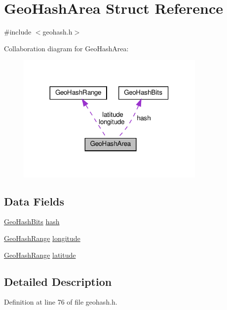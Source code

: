 \hypertarget{struct_geo_hash_area}{}\section{Geo\+Hash\+Area Struct Reference}
\label{struct_geo_hash_area}


{\ttfamily \#include $<$geohash.\+h$>$}



Collaboration diagram for Geo\+Hash\+Area\+:
\nopagebreak
\begin{figure}[H]
\begin{center}
\leavevmode
\includegraphics[width=260pt]{struct_geo_hash_area__coll__graph}
\end{center}
\end{figure}
\subsection*{Data Fields}
\begin{DoxyCompactItemize}
\item 
\hyperlink{struct_geo_hash_bits}{Geo\+Hash\+Bits} \hyperlink{struct_geo_hash_area_aaa5dc202256f654179069f62d2d44cf6}{hash}
\item 
\hyperlink{struct_geo_hash_range}{Geo\+Hash\+Range} \hyperlink{struct_geo_hash_area_ac9676284dd4031f83c6bf264b79267c6}{longitude}
\item 
\hyperlink{struct_geo_hash_range}{Geo\+Hash\+Range} \hyperlink{struct_geo_hash_area_a131bc0a0b8951efaf43616802da61d34}{latitude}
\end{DoxyCompactItemize}


\subsection{Detailed Description}


Definition at line 76 of file geohash.\+h.



